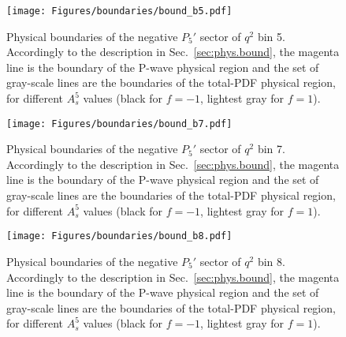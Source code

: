 \begin{figure}[!hbt]
  \centering
  \texttt{[image: Figures/boundaries/bound\_b5.pdf]}
  \caption{Physical boundaries of the negative $P_5'$ sector of $q^2$ bin 5. Accordingly to the description in Sec.~\ref{sec:phys.bound}, the magenta line is the boundary of the P-wave physical region and the set of gray-scale lines are the boundaries of the total-PDF physical region, for different $A_s^5$ values (black for $f=-1$, lightest gray for $f=1$).}
  \label{fig:bound5}
\end{figure}

\begin{figure}[!hbt]
  \centering
  \texttt{[image: Figures/boundaries/bound\_b7.pdf]}
  \caption{Physical boundaries of the negative $P_5'$ sector of $q^2$ bin 7. Accordingly to the description in Sec.~\ref{sec:phys.bound}, the magenta line is the boundary of the P-wave physical region and the set of gray-scale lines are the boundaries of the total-PDF physical region, for different $A_s^5$ values (black for $f=-1$, lightest gray for $f=1$).}
  \label{fig:bound7}
\end{figure}

\begin{figure}[!hbt]
  \centering
  \texttt{[image: Figures/boundaries/bound\_b8.pdf]}
  \caption{Physical boundaries of the negative $P_5'$ sector of $q^2$ bin 8. Accordingly to the description in Sec.~\ref{sec:phys.bound}, the magenta line is the boundary of the P-wave physical region and the set of gray-scale lines are the boundaries of the total-PDF physical region, for different $A_s^5$ values (black for $f=-1$, lightest gray for $f=1$).}
  \label{fig:bound8}
\end{figure}
